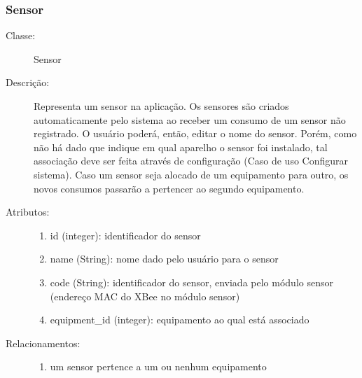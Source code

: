 \subsubsection{Sensor}
\begin{description}
  \item[Classe:] Sensor
  \item[Descrição:] Representa um sensor na aplicação. Os sensores são criados automaticamente pelo sistema ao receber um consumo de um sensor não registrado. O usuário poderá, então, editar o nome do sensor. Porém, como não há dado que indique em qual aparelho o sensor foi instalado, tal associação deve ser feita através de configuração (Caso de uso Configurar sistema). Caso um sensor seja alocado de um equipamento para outro, os novos consumos passarão a pertencer ao segundo equipamento.
  \item[Atributos:] \hfill
    \begin{enumerate}
      \item id (integer): identificador do sensor
      \item name (String): nome dado pelo usuário para o sensor
      \item code (String): identificador do sensor, enviada pelo módulo sensor (endereço MAC do XBee no módulo sensor)
      \item equipment\_id (integer): equipamento ao qual está associado
    \end{enumerate}
  \item[Relacionamentos:] \hfill
    \begin{enumerate}
      \item um sensor pertence a um ou nenhum equipamento
    \end{enumerate}
\end{description} 
%
